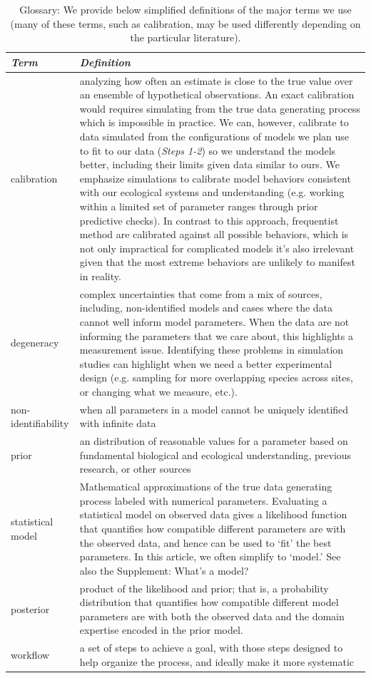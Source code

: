 \documentclass[11pt]{article}
\begin{document}
\begin{table}
\caption{Glossary: We provide below simplified definitions of the major terms we use (many of these terms, such as calibration, may be used differently depending on the particular literature). }
\begin{tabular}{ p{3 cm}  p{13 cm} }  \hline \hline
 \emph{Term}   & \emph{Definition}\\ 
\hline \hline
calibration & analyzing how often an estimate is close to the true value over an ensemble of hypothetical observations.  An exact calibration would requires simulating from the true data generating process which is impossible in practice.  We can, however, calibrate to data simulated from the configurations of models we plan use to fit to our data (\emph{Steps 1-2}) so we understand the models better, including their limits given data similar to ours. We emphasize simulations to calibrate model behaviors consistent with our ecological systems and understanding (e.g. working within a limited set of parameter ranges through prior predictive checks). In contrast to this approach, frequentist method are calibrated against all possible behaviors, which is not only impractical for complicated models it’s also irrelevant given that the most extreme behaviors are unlikely to manifest in reality. \\\hline
degeneracy & complex uncertainties that come from a mix of sources, including, non-identified models and cases where the data cannot well inform model parameters. When the data are not informing the parameters that we care about, this highlights a measurement issue. Identifying these problems in simulation studies can highlight when we need a better experimental design (e.g. sampling for more overlapping species across sites, or changing what we measure, etc.).  \\\hline
non-identifiability & when all parameters in a model cannot be uniquely identified with infinite data \\\hline
prior & an distribution of reasonable values for a parameter based on fundamental biological and ecological understanding, previous research, or other sources \\\hline
statistical model & Mathematical approximations of the true data generating process labeled with numerical parameters.  Evaluating a statistical model on observed data gives a likelihood function that quantifies how compatible different parameters are with the observed data, and hence can be used to `fit' the best parameters. In this article, we often simplify to `model.' See also the Supplement: What's a model? \\\hline
posterior & product of the likelihood and prior; that is, a probability distribution that quantifies how compatible different model parameters are with both the observed data and the domain expertise encoded in the prior model. \\\hline
workflow & a set of steps to achieve a goal, with those steps designed to help organize the process, and ideally make it more systematic  \\\hline
\hline
\end{tabular}
\label{tab:glossary}
\end{table}
\end{document}
